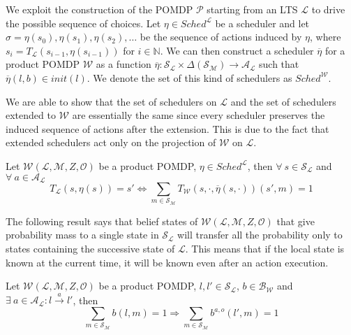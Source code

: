 We exploit the construction of the \ac{POMDP} $\mathcal{P}$ starting from an \ac{LTS} $\mathcal{L}$ to drive the possible sequence of choices. Let $\eta \in Sched^\mathcal{L}$ be a scheduler and let $\sigma = \eta(s_0),\eta(s_1),\eta(s_2),\dots$ be the sequence of actions induced by $\eta$, where $s_i = T_\mathcal{L}(s_{i-1},\eta(s_{i-1}))$ for $i \in \mathbb{N}$. We can then construct a scheduler $\overline\eta$ for a product \ac{POMDP} $\mathcal{W}$ as a function $\overline\eta : \mathcal{S}_\mathcal{L} \times \Delta(\mathcal{S}_\mathcal{M}) \rightarrow \mathcal{A}_\mathcal{L}$ such that $ \overline\eta(l,b) \in init(l) $. We denote the set of this kind of schedulers as $Sched^\mathcal{W}$. 

We are able to show that the set of schedulers on $\mathcal{L}$ and the set of schedulers extended to $\mathcal{W}$ are essentially the same since every scheduler preserves the induced sequence of actions after the extension. This is due to the fact that extended schedulers act only on the projection of $\mathcal{W}$ on $\mathcal{L}$.

\begin{proposition}\label{prop:sched}
Let $\mathcal{W}(\mathcal{L},\mathcal{M},Z,\mathcal{O})$ be a product \ac{POMDP}, $\eta \in Sched^\mathcal{L}$, then $\forall\ s \in \mathcal{S}_\mathcal{L}$ and $\forall\ a \in \mathcal{A}_\mathcal{L}$ 
$$ T_\mathcal{L}(s,\eta(s)) = s' \iff \sum_{m \in \mathcal{S}_\mathcal{M}} T_\mathcal{W}(s,\cdot,\overline\eta(s,\cdot))(s',m) = 1 $$
\end{proposition}

The following result says that belief states of $\mathcal{W}(\mathcal{L}, \mathcal{M}, Z, \mathcal{O})$ that give probability mass to a single state in $\mathcal{S}_\mathcal{L}$ will transfer all the probability only to states containing the successive state of $\mathcal{L}$. This means that if the local state is known at the current time, it will be known even after an action execution.

\begin{proposition} \label{prop:beliefprob}
Let $\mathcal{W}(\mathcal{L},\mathcal{M},Z,\mathcal{O})$ be a product \ac{POMDP}, $l,l' \in \mathcal{S}_\mathcal{L}$, $b \in \mathcal{B}_\mathcal{W}$ and $\exists\ a \in \mathcal{A}_\mathcal{L} : l \xrightarrow{a} l'$, then 
$$ \sum_{m \in \mathcal{S}_{\mathcal{M}}} b(l,m) = 1 \Rightarrow \sum_{m\in \mathcal{S}_{\mathcal{M}}} b^{a,o}(l',m) = 1 $$
\end{proposition}

